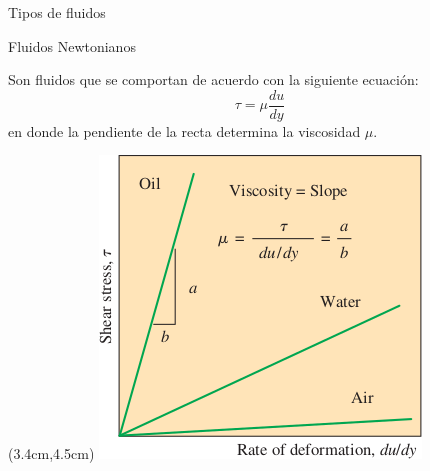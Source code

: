 \documentclass [xcolor=svgnames, t] {beamer}
\begin{document}
\begin{frame}{Tipos de fluidos}
\vspace{-0.5cm}
\begin{block}{Fluidos Newtonianos}

Son fluidos que se comportan de acuerdo con la siguiente ecuaci\'on:
$$
\tau = \mu \frac{d u}{d y}
$$
en donde la pendiente de la recta determina la viscosidad $\mu$.
\end{block}
\begin{textblock*}{4.6cm}(3.4cm,4.5cm) %
\includegraphics[width=\textwidth]{fnewt}
\end{textblock*}
\end{frame}
\end{document}
